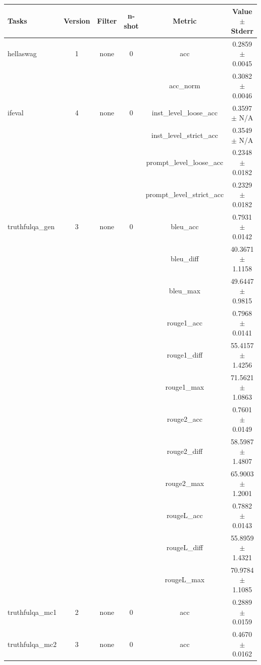 \documentclass{ifacconf}
\begin{document}
	\vfill
	\clearpage
	\pagebreak
	
	\begin{strip}
		\begin{minipage}{\textwidth}
			\begin{table}[H]
				\centering
				\begin{tabular}{|l|c|c|c|c|c|}
					\hline
					\textbf{Tasks} & \textbf{Version} & \textbf{Filter} & \textbf{n-shot} & \textbf{Metric} & \textbf{Value} $\pm$ \textbf{Stderr} \\ \hline
					hellaswag & 1 & none & 0 & acc & 0.2859 $\pm$ 0.0045 \\ \hline
					& & & & acc\_norm & 0.3082 $\pm$ 0.0046 \\ \hline
					ifeval & 4 & none & 0 & inst\_level\_loose\_acc & 0.3597 $\pm$ N/A \\ \hline
					& & & & inst\_level\_strict\_acc & 0.3549 $\pm$ N/A \\ \hline
					& & & & prompt\_level\_loose\_acc & 0.2348 $\pm$ 0.0182 \\ \hline
					& & & & prompt\_level\_strict\_acc & 0.2329 $\pm$ 0.0182 \\ \hline
					truthfulqa\_gen & 3 & none & 0 & bleu\_acc & 0.7931 $\pm$ 0.0142 \\ \hline
					& & & & bleu\_diff & 40.3671 $\pm$ 1.1158 \\ \hline
					& & & & bleu\_max & 49.6447 $\pm$ 0.9815 \\ \hline
					& & & & rouge1\_acc & 0.7968 $\pm$ 0.0141 \\ \hline
					& & & & rouge1\_diff & 55.4157 $\pm$ 1.4256 \\ \hline
					& & & & rouge1\_max & 71.5621 $\pm$ 1.0863 \\ \hline
					& & & & rouge2\_acc & 0.7601 $\pm$ 0.0149 \\ \hline
					& & & & rouge2\_diff & 58.5987 $\pm$ 1.4807 \\ \hline
					& & & & rouge2\_max & 65.9003 $\pm$ 1.2001 \\ \hline
					& & & & rougeL\_acc & 0.7882 $\pm$ 0.0143 \\ \hline
					& & & & rougeL\_diff & 55.8959 $\pm$ 1.4321 \\ \hline
					& & & & rougeL\_max & 70.9784 $\pm$ 1.1085 \\ \hline
					truthfulqa\_mc1 & 2 & none & 0 & acc & 0.2889 $\pm$ 0.0159 \\ \hline
					truthfulqa\_mc2 & 3 & none & 0 & acc & 0.4670 $\pm$ 0.0162 \\ \hline
				\end{tabular}
				\label{tab:gemma2_q8}
			\end{table}
			

\end{minipage}
\end{strip}
\end{document}
